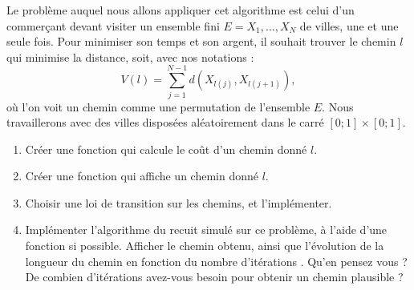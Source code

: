 Le problème auquel nous allons appliquer cet algorithme est celui d'un commerçant devant visiter un ensemble fini $E={X_1,...,X_N}$ de villes, une et une seule fois. Pour minimiser son temps et son argent, il souhait trouver le chemin $l$ qui minimise la distance, soit, avec nos notations :
\[V(l)=\sum_{j=1}^{N-1} d(X_{l(j)},X_{l(j+1)}),\]
où l'on voit un chemin comme une permutation de l'ensemble $E$. Nous travaillerons avec des villes disposées aléatoirement dans le carré $[0;1]\times [0;1]$.
 
\begin{enumerate}
\item Créer une fonction qui calcule le coût d'un chemin donné $l$.
\item Créer une fonction qui affiche un chemin donné $l$.
\item Choisir une loi de transition sur les chemins, et l'implémenter.
\item Implémenter l'algorithme du recuit simulé sur ce problème, à l'aide d'une fonction si possible. Afficher le chemin obtenu, ainsi que l'évolution de la longueur du chemin en fonction du nombre d'itérations . Qu'en pensez vous ? De combien d'itérations avez-vous besoin pour obtenir un chemin plausible ? 
\end{enumerate}

